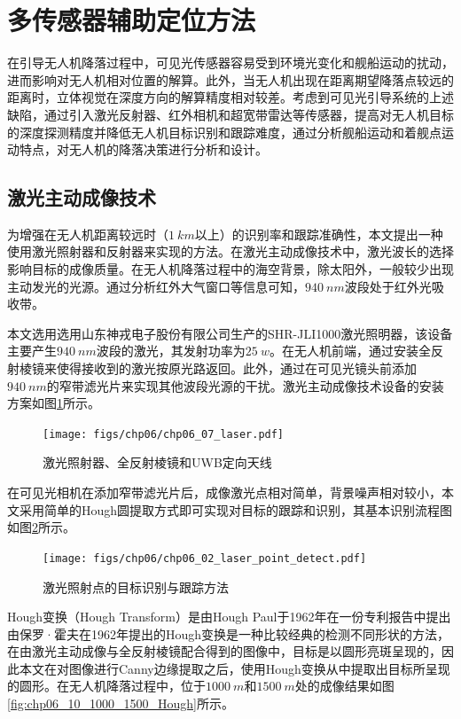 \section{多传感器辅助定位方法}
在引导无人机降落过程中，可见光传感器容易受到环境光变化和舰船运动的扰动，进而影响对无人机相对位置的解算。此外，当无人机出现在距离期望降落点较远的距离时，立体视觉在深度方向的解算精度相对较差。考虑到可见光引导系统的上述缺陷，通过引入激光反射器、红外相机和超宽带雷达等传感器，提高对无人机目标的深度探测精度并降低无人机目标识别和跟踪难度，通过分析舰船运动和着舰点运动特点，对无人机的降落决策进行分析和设计。

\subsection{激光主动成像技术}
为增强在无人机距离较远时（$1\ km$以上）的识别率和跟踪准确性，本文提出一种使用激光照射器和反射器来实现的方法。在激光主动成像技术中，激光波长的选择影响目标的成像质量。在无人机降落过程中的海空背景，除太阳外，一般较少出现主动发光的光源。通过分析红外大气窗口等信息可知，$940\ nm$波段处于红外光吸收带。

本文选用选用山东神戎电子股份有限公司生产的SHR-JLI1000激光照明器，该设备主要产生$940\ nm$波段的激光，其发射功率为$25\ w$。在无人机前端，通过安装全反射棱镜来使得接收到的激光按原光路返回。此外，通过在可见光镜头前添加$940\ nm$的窄带滤光片来实现其他波段光源的干扰。激光主动成像技术设备的安装方案如图\ref{fig:chp06_07_laser}所示。

\begin{figure}[!h]
	\centering
	\texttt{[image: figs/chp06/chp06\_07\_laser.pdf]}	
	\caption{激光照射器、全反射棱镜和UWB定向天线}
	\label{fig:chp06_07_laser}
\end{figure}

在可见光相机在添加窄带滤光片后，成像激光点相对简单，背景噪声相对较小，本文采用简单的Hough圆提取方式即可实现对目标的跟踪和识别，其基本识别流程图如图\ref{fig:chp06_02_laser_point_detect}所示。

\begin{figure}[!t]
	\centering
	\texttt{[image: figs/chp06/chp06\_02\_laser\_point\_detect.pdf]}	
	\caption{激光照射点的目标识别与跟踪方法}
	\label{fig:chp06_02_laser_point_detect}
\end{figure}

Hough变换（Hough Transform）是由Hough Paul于1962年在一份专利报告中提出\cite{vc1962method}
由保罗·霍夫在1962年提出的Hough变换是一种比较经典的检测不同形状的方法，在由激光主动成像与全反射棱镜配合得到的图像中，目标是以圆形亮斑呈现的，因此本文在对图像进行Canny边缘提取之后，使用Hough变换从中提取出目标所呈现的圆形。在无人机降落过程中，位于$1000\ m$和$1500\ m$处的成像结果如图\ref{fig:chp06_10_1000_1500_Hough}所示。

